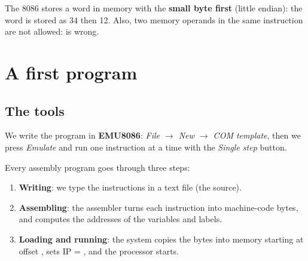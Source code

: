 \begin{intabih}
    The 8086 stores a word in memory with the \textbf{small byte first} (little endian): the word 
    is stored as 34 then 12. Also, two memory operands in the same instruction are not allowed:  is wrong.
\end{intabih}

\section{A first program}

\subsection{The tools}
We write the program in \textbf{EMU8086}: \emph{File $\rightarrow$ New $\rightarrow$ COM template}, then we press
\emph{Emulate} and run one instruction at a time with the \emph{Single step} button.

Every assembly program goes through three steps:
\begin{center}
\end{center}
\begin{enumerate}
    \item \textbf{Writing}: we type the instructions in a text file (the source).
    \item \textbf{Assembling}: the assembler turns each instruction into machine-code bytes, and computes the
          addresses of the variables and labels.
    \item \textbf{Loading and running}: the system copies the bytes into memory starting at offset ,
          sets IP = , and the processor starts.
\end{enumerate}

